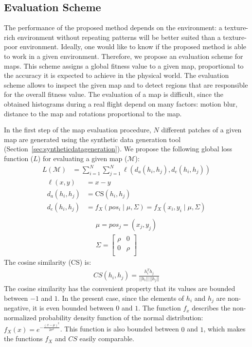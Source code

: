 \subsection{Evaluation Scheme}
\label{sec:evaluationscheme}

The performance of the proposed method depends on the environment: a
texture-rich environment without repeating patterns will be better
suited than a texture-poor environment. Ideally, one would like to
know if the proposed method is able to work in a given
environment. Therefore, we propose an evaluation scheme for maps. This
scheme assigns a global fitness value to a given map, proportional to
the accuracy it is expected to achieve in the physical world. The
evaluation scheme allows to inspect the given map and to detect
regions that are responsible for the overall fitness value. The
evaluation of a map is difficult, since the obtained histograms during
a real flight depend on many factors: motion blur, distance to the map
and rotations proportional to the map.

In the first step of the map evaluation procedure, $N$ different
patches of a given map are generated using the synthetic data
generation tool (Section~\ref{sec:syntheticdatageneration}). We
propose the following global loss function ($L$) for evaluating a
given map ($\mathcal{M}$):
\begin{align}
  L(\mathcal{M}) &= \sum_{i = 1}^{N} \sum_{j = 1}^{N} \ell(d_a(h_i, h_j), d_e(h_i, h_j))
\end{align}
\begin{align}
  \ell(x, y) &= x - y\\
  d_a(h_i, h_j) &= \text{CS}(h_i, h_j)\\
  d_e(h_i, h_j) &= f_X(pos_i \mid \mu, \Sigma) = f_X(x_i, y_i \mid \mu, \Sigma)\\
\end{align}
\begin{align}
\mu = pos_j = (x_j, y_j)\\
\Sigma =
  \begin{bmatrix}
    \rho & 0\\
    0 & \rho\\
  \end{bmatrix}
\end{align}
The cosine similarity (CS) is:
\begin{align}
CS(h_i, h_j) = \frac{h_i^Th_j}{||h_i||\,||h_j||}
\end{align}
The cosine similarity has the convenient property that its values are
bounded between $-1$ and $1$. In the present case, since the elements
of $h_i$ and $h_j$ are non-negative, it is even bounded between $0$
and $1$. The function $f_x$ describes the non-normalized probability
density function of the normal distribution:
$f_X(x) = e^{- \frac{(x - \mu)^2}{2 \sigma ^ 2}}$. This function is
also bounded between $0$ and $1$, which makes the functions $f_X$ and
$CS$ easily comparable.

